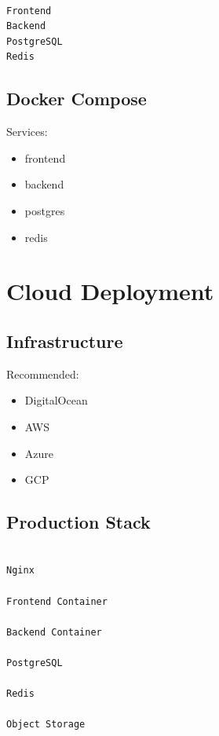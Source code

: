 \documentclass[11pt,a4paper]{article}
\begin{document}
\begin{verbatim}

Frontend
Backend
PostgreSQL
Redis

\end{verbatim}

\subsection{Docker Compose}

Services:

\begin{itemize}
\item frontend
\item backend
\item postgres
\item redis
\end{itemize}

\section{Cloud Deployment}

\subsection{Infrastructure}

Recommended:

\begin{itemize}
\item DigitalOcean
\item AWS
\item Azure
\item GCP
\end{itemize}

\subsection{Production Stack}

\begin{verbatim}

Nginx

Frontend Container

Backend Container

PostgreSQL

Redis

Object Storage

\end{verbatim}

\end{document}
